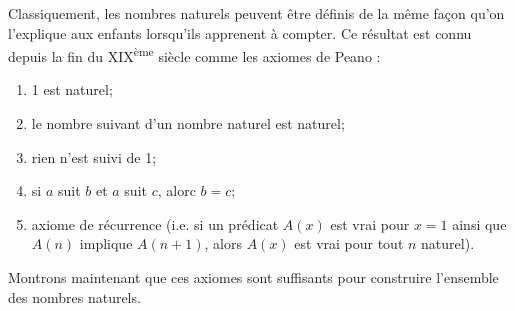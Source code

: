 \documentclass[12pt, a4paper]{article}
\begin{document}
Classiquement, les nombres naturels peuvent être définis de la même façon qu'on l'explique aux enfants lorsqu'ils apprenent à compter. Ce résultat est connu depuis la fin du XIX\textsuperscript{ème} siècle comme les axiomes de Peano :
\begin{enumerate}
	\item 1 est naturel;
	\item le nombre suivant d'un nombre naturel est naturel;
	\item rien n'est suivi de 1;
	\item si $a$ suit $b$ et $a$ suit $c$, alorc $b=c$;
	\item axiome de récurrence (i.e. si un prédicat $A(x)$ est vrai pour $x=1$ ainsi que $A(n)$ implique $A(n+1)$, alors $A(x)$ est vrai pour tout $n$ naturel).
\end{enumerate}
Montrons maintenant que ces axiomes sont suffisants pour construire l'ensemble des nombres naturels.
\end{document}

